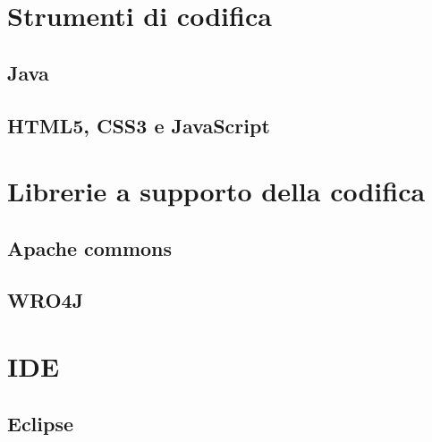 \section{Strumenti di codifica}
\subsection{Java}

\subsection{HTML5, CSS3 e JavaScript}


\section{Librerie a supporto della codifica}
\subsection{Apache commons}

\subsection{WRO4J}


\section{IDE}
\subsection{Eclipse}
